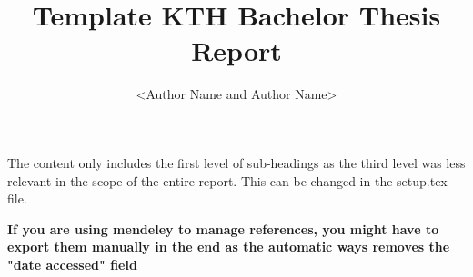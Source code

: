 \documentclass[12pt]{article}
\title{Template KTH Bachelor Thesis Report}
\author{<Author Name and Author Name>}
\begin{document}



\newpage
{}



\customtoc

The content only includes the first level of sub-headings as the third level was less relevant in the scope of the entire report. This can be changed in the setup.tex file.









% 

\newpage
{}
\textbf{If you are using mendeley to manage references, you might have to export them manually in the end as the automatic ways removes the "date accessed" field}
\printbibliography




\end{document}
